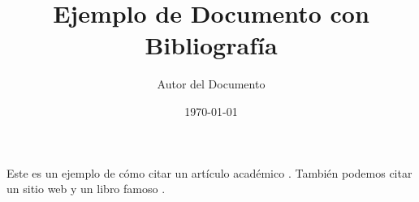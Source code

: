 \documentclass{article}
\begin{document}
\title{Ejemplo de Documento con Bibliografía}
\author{Autor del Documento}
\date{\today}
\maketitle

Este es un ejemplo de cómo citar un artículo académico \cite{einstein1905}. También podemos citar un sitio web \cite{icpan} y un libro famoso \cite{knuth1997}.

\end{document}
